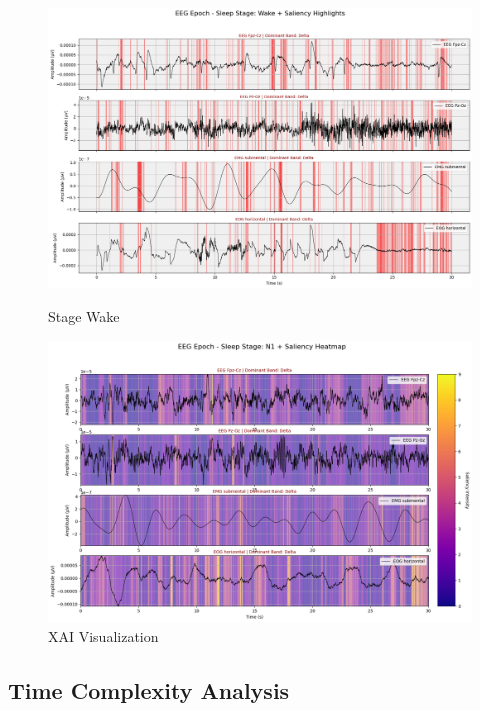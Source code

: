 \begin{figure}[htbp]
	\centering
	\begin{minipage}[b]{0.45\linewidth}
		\includegraphics[width=\linewidth]{"img/paper_3/stage wake"}
		\caption{Stage Wake}
		\label{fig:stage-wake}
	\end{minipage}
	\hfill
	\begin{minipage}[b]{0.45\linewidth}
		\includegraphics[width=\linewidth]{img/paper_3/XAI4}
		\caption{XAI Visualization}
		\label{fig:xai4}
	\end{minipage}
\end{figure}


\subsection{Time Complexity Analysis}

